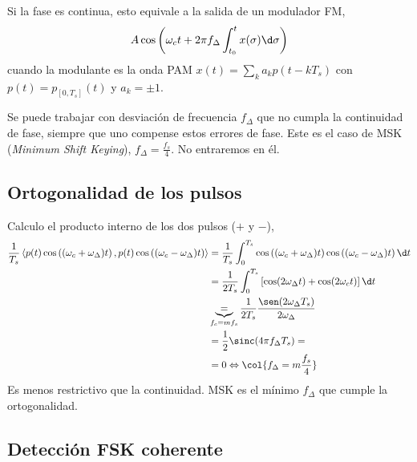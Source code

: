     \begin{remarkSN}
        Si la fase es continua, esto equivale a la salida de un modulador FM,
        \[A\cos\left(\omega_ct +2\pi f_\Delta \int_{t_0}^t x(\sigma) \d\sigma\right)\]
        cuando la modulante es la onda PAM $x(t)=\sum_k a_k p(t-kT_s)$ con $p(t)=p_{[0,T_s]}(t)$ y $a_k=\pm 1$.
    \end{remarkSN}

    \begin{remarkSN}
        Se puede trabajar con desviación de frecuencia $f_\Delta$ que no cumpla la continuidad de fase, siempre que uno compense estos errores de fase. Este es el caso de MSK (\emph{Minimum Shift Keying}), $f_\Delta=\frac{f_s}{4}$. No entraremos en él.
    \end{remarkSN}

\subsection*{Ortogonalidad de los pulsos}
Calculo el producto
interno de los dos pulsos ($+$ y $-$),
    \begin{align*}
        \frac{1}{T_s}\left<p(t)\cos\left((\omega_c+\omega_\Delta)t\right),p(t)\cos\left((\omega_c-\omega_\Delta)t\right)\right>
        &= \frac{1}{T_s}\int_0^{T_s} \cos\left((\omega_c+\omega_\Delta)t\right)\cos\left((\omega_c-\omega_\Delta)t\right)\d t \\
        & = \frac{1}{2T_s}\int_0^{T_s}\left[\cos(2\omega_\Delta t)+\cos(2\omega_c t)\right]\d t\\
      & \underbrace{=}_{f_c=mf_s} \frac{1}{2T_s} \frac{\sen(2\omega_\Delta T_s)}{2\omega_\Delta} \\
      &=  \frac{1}{2}\sinc(4\pi f_\Delta T_s)=\\
        &= 0 \Leftrightarrow \col{f_\Delta = m\frac{f_s}{4}}
    \end{align*}
    Es menos restrictivo que la continuidad. MSK es el mínimo $f_\Delta$ que cumple la ortogonalidad.

\newpage

\subsection*{Detección FSK coherente}

